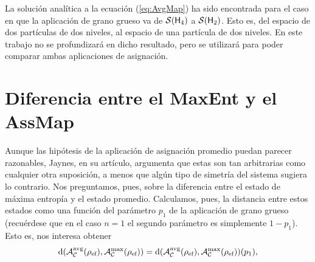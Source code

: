 La solución analítica a la ecuación (\ref{eq:AvgMap}) ha sido encontrada para el caso en que la aplicación de grano grueso va de $\mathcal{S}({\sf H}_{4})$ a $\mathcal{S}({\sf H}_{2})$. Esto es, del espacio de dos partículas de dos niveles, al espacio de una partícula de dos niveles. En este trabajo no se profundizará en dicho resultado, pero se utilizará para poder comparar ambas aplicaciones de asignación.

\section{Diferencia entre el MaxEnt y el AssMap}

Aunque las hipótesis de la aplicación de asignación promedio puedan parecer razonables, Jaynes, en su artículo, argumenta que estas son tan arbitrarias como cualquier otra suposición, a menos que algún tipo de simetría del sistema sugiera lo contrario. Nos preguntamos, pues, sobre la diferencia entre el estado de máxima entropía y el estado promedio. Calculamos, pues, la distancia entre estos estados como una función del parámetro $p_{1}$ de la aplicación de grano grueso (recuérdese que en el caso $n=1$ el segundo parámetro es simplemente $1-p_{1}$). Esto es, nos interesa obtener
\begin{equation}
    \text{d}\qty(\mathcal{A}_{\mathcal{C}}^{\text{avg}}(\rho_{\text{ef}}),\mathcal{A}_{\mathcal{C}}^{\max}(\rho_{\text{ef}}))=\text{d}\qty(\mathcal{A}_{\mathcal{C}}^{\text{avg}}(\rho_{\text{ef}}),\mathcal{A}_{\mathcal{C}}^{\max}(\rho_{\text{ef}}))(p_{1}),\nonumber
\end{equation}

